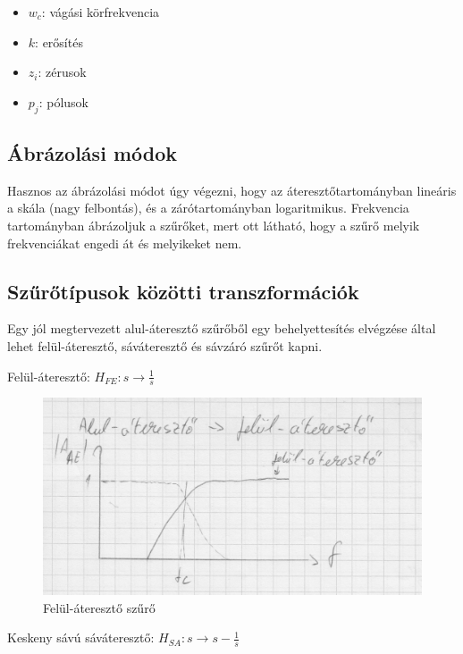 \begin{itemize}
    \item $w_{c}$: vágási körfrekvencia
    \item $k$: erősítés
    \item $z_{i}$: zérusok
    \item $p_{j}$: pólusok
\end{itemize}

\subsection{Ábrázolási módok}

Hasznos az ábrázolási módot úgy végezni, hogy az áteresztőtartományban lineáris a skála (nagy felbontás), és a zárótartományban logaritmikus. Frekvencia tartományban ábrázoljuk a szűrőket, mert ott látható, hogy a szűrő melyik frekvenciákat engedi át és melyikeket nem.

\subsection{Szűrőtípusok közötti transzformációk}

Egy jól megtervezett alul-áteresztő szűrőből egy behelyettesítés elvégzése által lehet felül-áteresztő, sáváteresztő és sávzáró szűrőt kapni.

Felül-áteresztő: $H_{FE}: s \rightarrow \frac{1}{s}$

\begin{figure}[H]
    \centering
    \includegraphics[scale=0.2]{figures/szuro_hp.jpg}
    \caption{Felül-áteresztő szűrő}
\end{figure}

Keskeny sávú sáváteresztő: $H_{SA}: s \rightarrow s - \frac{1}{s}$

